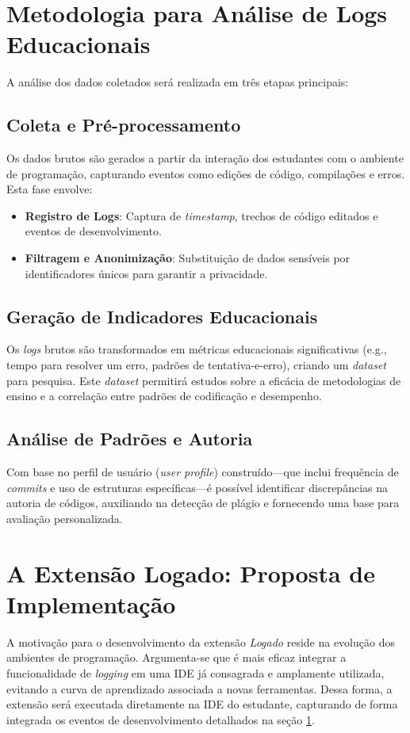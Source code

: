 \section{Metodologia para Análise de Logs Educacionais}
\label{sec:metodologia-analise}

A análise dos dados coletados será realizada em três etapas principais:

\subsection{Coleta e Pré-processamento}
Os dados brutos são gerados a partir da interação dos estudantes com o ambiente de programação, capturando eventos como edições de código, compilações e erros. Esta fase envolve:
\begin{itemize}
    \item \textbf{Registro de Logs}: Captura de \textit{timestamp}, trechos de código editados e eventos de desenvolvimento.
    \item \textbf{Filtragem e Anonimização}: Substituição de dados sensíveis por identificadores únicos para garantir a privacidade.
\end{itemize}

\subsection{Geração de Indicadores Educacionais}
Os \textit{logs} brutos são transformados em métricas educacionais significativas (e.g., tempo para resolver um erro, padrões de tentativa-e-erro), criando um \textit{dataset} para pesquisa. Este \textit{dataset} permitirá estudos sobre a eficácia de metodologias de ensino e a correlação entre padrões de codificação e desempenho.

\subsection{Análise de Padrões e Autoria}
Com base no perfil de usuário (\textit{user profile}) construído—que inclui frequência de \textit{commits} e uso de estruturas específicas—é possível identificar discrepâncias na autoria de códigos, auxiliando na detecção de plágio e fornecendo uma base para avaliação personalizada.

\section{A Extensão Logado: Proposta de Implementação}
\label{sec:extensao-logado}

A motivação para o desenvolvimento da extensão \textit{Logado} reside na evolução dos ambientes de programação. Argumenta-se que é mais eficaz integrar a funcionalidade de \textit{logging} em uma IDE já consagrada e amplamente utilizada, evitando a curva de aprendizado associada a novas ferramentas. Dessa forma, a extensão será executada diretamente na IDE do estudante, capturando de forma integrada os eventos de desenvolvimento detalhados na seção \ref{sec:metodologia-analise}.